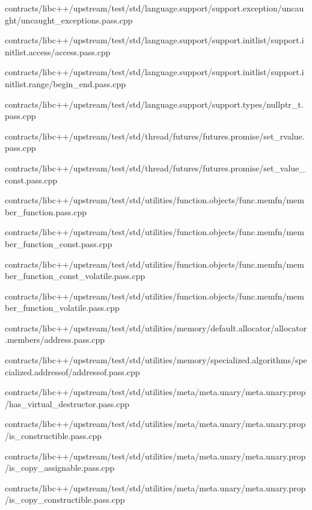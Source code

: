 \begin{DoxyCompactItemize}
contracts/libc++/upstream/test/std/language.\+support/support.\+exception/uncaught/uncaught\+\_\+exceptions.\+pass.\+cpp\item 
contracts/libc++/upstream/test/std/language.\+support/support.\+initlist/support.\+initlist.\+access/access.\+pass.\+cpp\item 
contracts/libc++/upstream/test/std/language.\+support/support.\+initlist/support.\+initlist.\+range/begin\+\_\+end.\+pass.\+cpp\item 
contracts/libc++/upstream/test/std/language.\+support/support.\+types/nullptr\+\_\+t.\+pass.\+cpp\item 
contracts/libc++/upstream/test/std/thread/futures/futures.\+promise/set\+\_\+rvalue.\+pass.\+cpp\item 
contracts/libc++/upstream/test/std/thread/futures/futures.\+promise/set\+\_\+value\+\_\+const.\+pass.\+cpp\item 
contracts/libc++/upstream/test/std/utilities/function.\+objects/func.\+memfn/member\+\_\+function.\+pass.\+cpp\item 
contracts/libc++/upstream/test/std/utilities/function.\+objects/func.\+memfn/member\+\_\+function\+\_\+const.\+pass.\+cpp\item 
contracts/libc++/upstream/test/std/utilities/function.\+objects/func.\+memfn/member\+\_\+function\+\_\+const\+\_\+volatile.\+pass.\+cpp\item 
contracts/libc++/upstream/test/std/utilities/function.\+objects/func.\+memfn/member\+\_\+function\+\_\+volatile.\+pass.\+cpp\item 
contracts/libc++/upstream/test/std/utilities/memory/default.\+allocator/allocator.\+members/address.\+pass.\+cpp\item 
contracts/libc++/upstream/test/std/utilities/memory/specialized.\+algorithms/specialized.\+addressof/addressof.\+pass.\+cpp\item 
contracts/libc++/upstream/test/std/utilities/meta/meta.\+unary/meta.\+unary.\+prop/has\+\_\+virtual\+\_\+destructor.\+pass.\+cpp\item 
contracts/libc++/upstream/test/std/utilities/meta/meta.\+unary/meta.\+unary.\+prop/is\+\_\+constructible.\+pass.\+cpp\item 
contracts/libc++/upstream/test/std/utilities/meta/meta.\+unary/meta.\+unary.\+prop/is\+\_\+copy\+\_\+assignable.\+pass.\+cpp\item 
contracts/libc++/upstream/test/std/utilities/meta/meta.\+unary/meta.\+unary.\+prop/is\+\_\+copy\+\_\+constructible.\+pass.\+cpp\item 

\end{DoxyCompactItemize}
